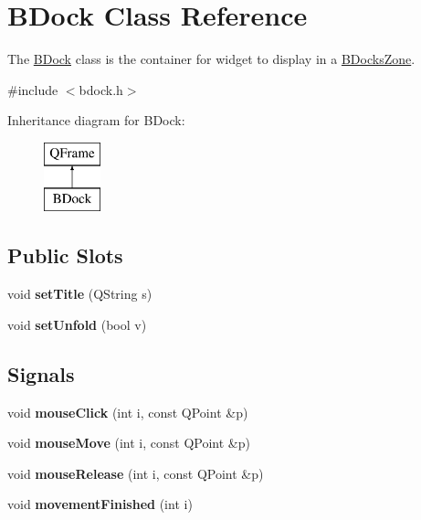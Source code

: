 \hypertarget{class_b_dock}{}\section{B\+Dock Class Reference}
\label{class_b_dock}


The \hyperlink{class_b_dock}{B\+Dock} class is the container for widget to display in a \hyperlink{class_b_docks_zone}{B\+Docks\+Zone}.  




{\ttfamily \#include $<$bdock.\+h$>$}

Inheritance diagram for B\+Dock\+:\begin{figure}[H]
\begin{center}
\leavevmode
\includegraphics[height=2.000000cm]{class_b_dock}
\end{center}
\end{figure}
\subsection*{Public Slots}
\begin{DoxyCompactItemize}
\item 
\hypertarget{class_b_dock_ad0552b2b035ddefbb08d0e43ff2a74d6}{}\label{class_b_dock_ad0552b2b035ddefbb08d0e43ff2a74d6} 
void {\bfseries set\+Title} (Q\+String s)
\item 
\hypertarget{class_b_dock_add467fabf0709c858a032113ec2ede80}{}\label{class_b_dock_add467fabf0709c858a032113ec2ede80} 
void {\bfseries set\+Unfold} (bool v)
\end{DoxyCompactItemize}
\subsection*{Signals}
\begin{DoxyCompactItemize}
\item 
\hypertarget{class_b_dock_a97c27119705ba63f80fa827c63a13b32}{}\label{class_b_dock_a97c27119705ba63f80fa827c63a13b32} 
void {\bfseries mouse\+Click} (int i, const Q\+Point \&p)
\item 
\hypertarget{class_b_dock_aafc27b012eaf8d3ef6a9d10df8406a60}{}\label{class_b_dock_aafc27b012eaf8d3ef6a9d10df8406a60} 
void {\bfseries mouse\+Move} (int i, const Q\+Point \&p)
\item 
\hypertarget{class_b_dock_ac0fccef29dee1c2d7e89567565671d22}{}\label{class_b_dock_ac0fccef29dee1c2d7e89567565671d22} 
void {\bfseries mouse\+Release} (int i, const Q\+Point \&p)
\item 
\hypertarget{class_b_dock_a8d5b322b2ac26b94a378636a1fc81ff1}{}\label{class_b_dock_a8d5b322b2ac26b94a378636a1fc81ff1} 
void {\bfseries movement\+Finished} (int i)
\end{DoxyCompactItemize}

